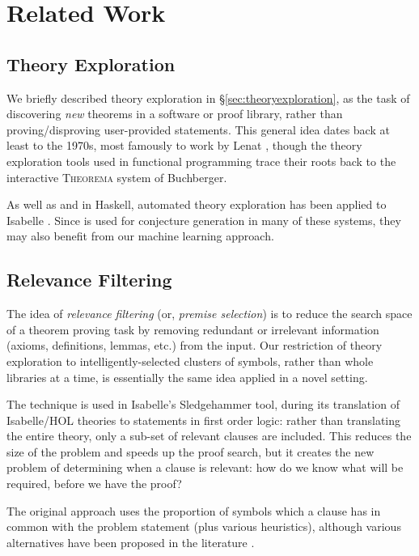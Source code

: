 \section{Related Work}
\label{sec:related}

\subsection{Theory Exploration}

We briefly described theory exploration in \S \ref{sec:theoryexploration}, as the task of discovering \emph{new} theorems in a software or proof library, rather than proving/disproving user-provided statements. This general idea dates back at least to the 1970s, most famously to work by Lenat \cite{lenat1977automated}, though the theory exploration tools used in functional programming trace their roots back to the interactive \textsc{Theorema} \cite{buchberger2000theory} system of Buchberger.

As well as \qspec{} and \hspec{} in Haskell, automated theory exploration has been applied to Isabelle \cite{Montano-Rivas.McCasland.Dixon.ea:2012} \cite{johansson2009isacosy} \cite{Hipster}. Since \qspec{} is used for conjecture generation in many of these systems, they may also benefit from our machine learning approach.

\subsection{Relevance Filtering}
\label{sec:relevance}

The idea of \emph{relevance filtering} (or, \emph{premise selection}) is to reduce the search space of a theorem proving task by removing redundant or irrelevant information (axioms, definitions, lemmas, etc.) from the input. Our restriction of theory exploration to intelligently-selected clusters of symbols, rather than whole libraries at a time, is essentially the same idea applied in a novel setting.

The technique is used in Isabelle's Sledgehammer tool, during its translation of Isabelle/HOL theories to statements in first order logic: rather than translating the entire theory, only a sub-set of relevant clauses are included. This reduces the size of the problem and speeds up the proof search, but it creates the new problem of determining when a clause is relevant: how do we know what will be required, before we have the proof?

The original approach uses the proportion of symbols which a clause has in common with the problem statement \cite{meng2009lightweight} (plus various heuristics), although various alternatives have been proposed in the literature \cite{kuhlwein2013mash} \cite{kuhlwein2012overview} \cite{alama2014premise}.

